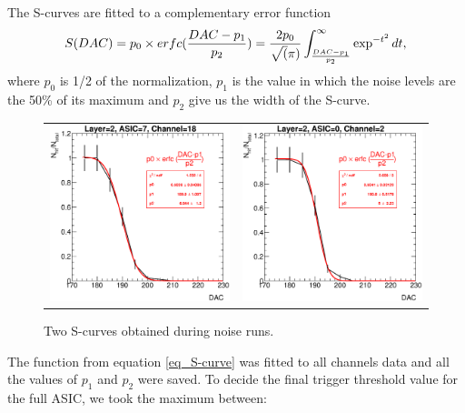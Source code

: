 \documentclass[a4paper,11pt]{article}
\begin{document}
The S-curves are fitted to a complementary error function
\begin{equation}
S(DAC)=p_{0} \times erfc(\frac{DAC-p_{1}}{p_{2}}) = 
\newline
\frac{2p_{0}}{\sqrt(\pi)} \int_{\frac{DAC-p_{1}}{p_{2}}}^{\infty} \exp^{-t^{2}} dt,
\label{eq_S-curve}
\end{equation}
where $p_{0}$ is 1/2 of the normalization, $p_{1}$ is the value in which the noise levels are 
the 50\% of its maximum and $p_{2}$ give us the width of the S-curve. 

\begin{figure}[!t]
  \centering
  \begin{tabular}{ll}
  \includegraphics[width=2.8in]{figs/commissioning/scurve_chn18_asic7_layer2.eps} & \includegraphics[width=2.8in]{figs/commissioning/scurve_chn2_asic0_layer2.eps}
  \end{tabular}
\caption{Two S-curves obtained during noise runs.}
\label{scurve_channels}
\end{figure}

The function from equation \ref{eq_S-curve} was fitted to all
channels data and all the values of $p_{1}$ and $p_{2}$ were saved.
To decide the final trigger threshold value for the full ASIC, we took the maximum between:
\end{document}
